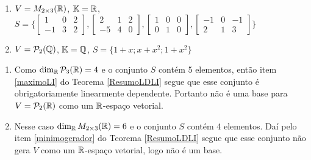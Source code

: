 \begin{exemplos}
\begin{exemplos}
\begin{enumerate}
    \item $V = M_{2 \times 3}(\mathbb{R})$, $\mathbb{K} = \mathbb{R}$, $S = \{\begin{bmatrix}1 & 0 & 2\\-1 & 3 & 2\end{bmatrix}, \begin{bmatrix}2 & 1 & 2\\-5 & 4 & 0\end{bmatrix}, \begin{bmatrix}1 & 0 & 0\\0 & 1 & 0\end{bmatrix},\begin{bmatrix}-1 & 0 & -1\\2 & 1 & 3\end{bmatrix}\}$
    
    \item $V = \mathcal{P}_2(\mathbb{Q})$, $\mathbb{K} = \mathbb{Q}$, $S = \{1 + x; x + x^2; 1 + x^2\}$
  \end{enumerate}

  \begin{solucao}
    \begin{enumerate}
      \item Como $\dim_{\mathbb{R}}\mathcal{P}_3(\mathbb{R}) = 4$ e o conjunto $S$ contém 5 elementos, então item \ref{maximoLI} do Teorema \ref{ResumoLDLI} segue que esse conjunto é obrigatoriamente linearmente dependente. Portanto não é uma base para $V = \mathcal{P}_2(\mathbb{R})$ como um $\mathbb{R}$-espaço vetorial.

      \item Nesse caso $\dim_{\mathbb{R}} M_{2 \times 3}(\mathbb{R}) = 6$ e o conjunto $S$ contém 4 elementos. Daí pelo item \ref{minimogerador} do Teorema \ref{ResumoLDLI} segue que esse conjunto não gera $V$ como um $\mathbb{R}$-espaço vetorial, logo não é um base.


\end{enumerate}
\end{solucao}
\end{exemplos}
\end{exemplos}
